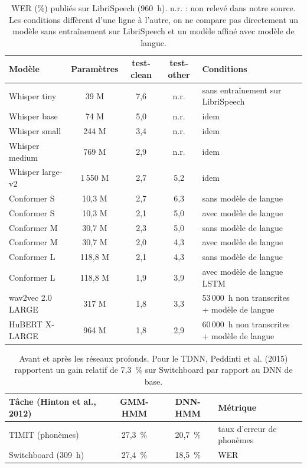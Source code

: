 \begin{table}[ht]
  \centering\footnotesize
  \begin{tabular}{lcccl}
    \toprule
    Modèle & Paramètres & test-clean & test-other & Conditions\\
    \midrule
    Whisper tiny & 39 M & 7,6 & n.r. & sans entraînement sur LibriSpeech\\
    Whisper base & 74 M & 5,0 & n.r. & idem\\
    Whisper small & 244 M & 3,4 & n.r. & idem\\
    Whisper medium & 769 M & 2,9 & n.r. & idem\\
    Whisper large-v2 & 1\,550 M & 2,7 & 5,2 & idem\\
    Conformer S & 10,3 M & 2,7 & 6,3 & sans modèle de langue\\
    Conformer S & 10,3 M & 2,1 & 5,0 & avec modèle de langue\\
    Conformer M & 30,7 M & 2,3 & 5,0 & sans modèle de langue\\
    Conformer M & 30,7 M & 2,0 & 4,3 & avec modèle de langue\\
    Conformer L & 118,8 M & 2,1 & 4,3 & sans modèle de langue\\
    Conformer L & 118,8 M & 1,9 & 3,9 & avec modèle de langue LSTM\\
    wav2vec 2.0 LARGE & 317 M & 1,8 & 3,3 & 53\,000~h non transcrites + modèle de langue\\
    HuBERT X-LARGE & 964 M & 1,8 & 2,9 & 60\,000~h non transcrites + modèle de langue\\
    \bottomrule
  \end{tabular}
  \caption{WER (\%) publiés sur LibriSpeech (960~h). n.r. : non relevé dans notre source. Les conditions diffèrent d'une ligne à l'autre, on ne compare pas directement un modèle sans entraînement sur LibriSpeech et un modèle affiné avec modèle de langue.}
\end{table}

\begin{table}[ht]
  \centering\footnotesize
  \begin{tabular}{lccl}
    \toprule
    Tâche (Hinton et al., 2012) & GMM-HMM & DNN-HMM & Métrique\\
    \midrule
    TIMIT (phonèmes) & 27,3~\% & 20,7~\% & taux d'erreur de phonèmes\\
    Switchboard (309~h) & 27,4~\% & 18,5~\% & WER\\
    \bottomrule
  \end{tabular}
  \caption{Avant et après les réseaux profonds. Pour le TDNN, Peddinti et al. (2015) rapportent un gain relatif de 7,3~\% sur Switchboard par rapport au DNN de base.}
\end{table}

